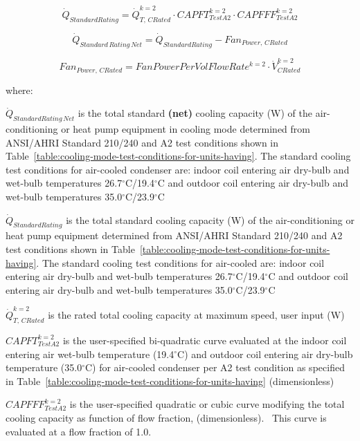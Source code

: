 \begin{equation}
{\dot Q_{StandardRating}} = \dot Q_{T,\,CRated}^{k = 2} \cdot CAPFT_{TestA2}^{k = 2} \cdot CAPFFF_{TestA2}^{k = 2}
\end{equation}

\begin{equation}
{\dot Q_{Standard\,Rating\,Net}} = {\dot Q_{StandardRating}} - Fa{n_{Power,\,CRated}}
\end{equation}

\begin{equation}
Fa{n_{Power,\,CRated}} = FanPowerPerVolFlowRat{e^{k = 2}} \cdot \dot V_{CRated}^{k = 2}
\end{equation}

where:

\({\dot Q_{StandardRating\,Net}}\) is the total standard \textbf{(net)} cooling capacity (W) of the air-conditioning or heat pump equipment in cooling mode determined from ANSI/AHRI Standard 210/240 and A2 test conditions shown in Table~\ref{table:cooling-mode-test-conditions-for-units-having}. The standard cooling test conditions for air-cooled condenser are: indoor coil entering air dry-bulb and wet-bulb temperatures 26.7\(^{\circ}\)C/19.4\(^{\circ}\)C and outdoor coil entering air dry-bulb and wet-bulb temperatures 35.0\(^{\circ}\)C/23.9\(^{\circ}\)C

\({\dot Q_{StandardRating}}\) is the total standard cooling capacity (W) of the air-conditioning or heat pump equipment determined from ANSI/AHRI Standard 210/240 and A2 test conditions shown in Table~\ref{table:cooling-mode-test-conditions-for-units-having}. The standard cooling test conditions for air-cooled are: indoor coil entering air dry-bulb and wet-bulb temperatures 26.7\(^{\circ}\)C/19.4\(^{\circ}\)C and outdoor coil entering air dry-bulb and wet-bulb temperatures 35.0\(^{\circ}\)C/23.9\(^{\circ}\)C

\(\dot Q_{T,\,CRated}^{k = 2}\) is the rated total cooling capacity at maximum speed, user input (W)

\(CAPFT_{TestA2}^{k = 2}\) is the user-specified bi-quadratic curve evaluated at the indoor coil entering air wet-bulb temperature (19.4\(^{\circ}\)C) and outdoor coil entering air dry-bulb temperature (35.0\(^{\circ}\)C) for air-cooled condenser per A2 test condition as specified in Table~\ref{table:cooling-mode-test-conditions-for-units-having} (dimensionless)

\(CAPFFF_{TestA2}^{k = 2}\) is the user-specified quadratic or cubic curve modifying the total cooling capacity as function of flow fraction, (dimensionless).~ This curve is evaluated at a flow fraction of 1.0.


